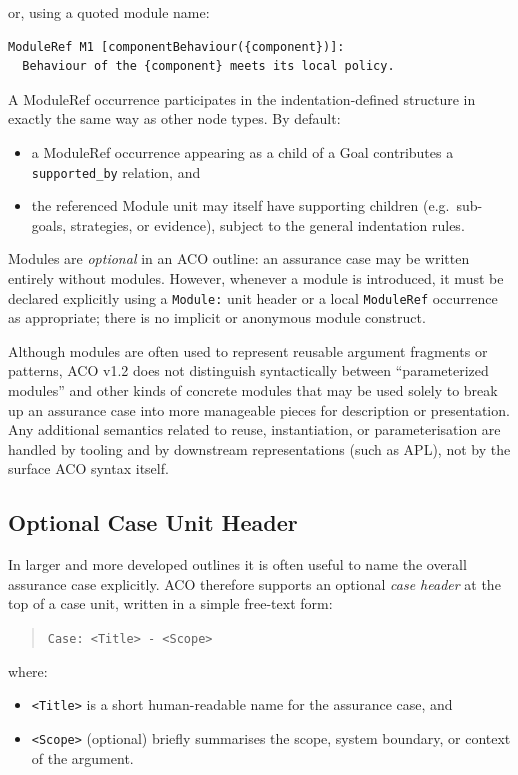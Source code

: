 \documentclass[11pt,twoside,a4paper]{article}
\begin{document}
or, using a quoted module name:
\begin{verbatim}
ModuleRef M1 [componentBehaviour({component})]:
  Behaviour of the {component} meets its local policy.
\end{verbatim}

A ModuleRef occurrence participates in the indentation-defined structure in exactly the same way as other node types. By default:
\begin{itemize}[leftmargin=2em]
  \item a ModuleRef occurrence appearing as a child of a Goal contributes a
        \texttt{supported\_by} relation, and
  \item the referenced Module unit may itself have supporting children (e.g.\ sub-goals, strategies, or evidence),
        subject to the general indentation rules.
\end{itemize}

Modules are \emph{optional} in an ACO outline: an assurance case may be written entirely
without modules. However, whenever a module is introduced, it must be declared explicitly
using a \texttt{Module:} unit header or a local \texttt{ModuleRef} occurrence as appropriate; there is no implicit or anonymous module construct.

Although modules are often used to represent reusable argument fragments or patterns,
ACO v1.2 does not distinguish syntactically between ``parameterized modules'' and other kinds
of concrete modules that may be used solely to break up an assurance case into more manageable pieces for description or presentation. Any additional semantics related to reuse, instantiation, or parameterisation
are handled by tooling and by downstream representations (such as APL), not by the
surface ACO syntax itself.


\subsection{Optional Case Unit Header}

In larger and more developed outlines it is often useful to name the overall assurance case explicitly.
ACO therefore supports an optional \emph{case header} at the top of a case unit, written
in a simple free-text form:

\begin{quote}
\texttt{Case: \textless Title\textgreater{} - \textless Scope\textgreater}
\end{quote}

where:
\begin{itemize}[leftmargin=2em]
  \item \texttt{\textless Title\textgreater{}} is a short human-readable name for the assurance case, and
  \item \texttt{\textless Scope\textgreater{}} (optional) briefly summarises the scope, system boundary,
        or context of the argument.
\end{itemize}
\end{document}
